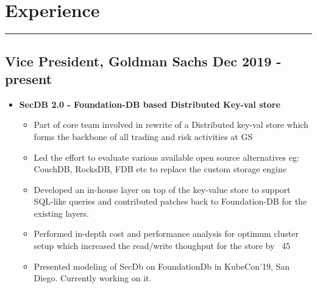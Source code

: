 \section*{Experience}
\hrule
\vspace{0.3cm}
\subsection*{\small {Vice President, Goldman Sachs \hfill Dec 2019 - present}}
\begin{itemize}[label=\textperiodcentered,labelindent=0pt,itemindent=1em,leftmargin=0.3cm,itemsep=0pt]
    \begin{itemize}[label=\textperiodcentered,itemindent=1em,leftmargin=0.3cm,itemsep=0pt]
        \item \textbf{SecDB 2.0 - Foundation-DB based Distributed Key-val store}
            \begin{itemize}
                \item {Part of core team involved in rewrite of a Distributed key-val store which forms the backbone of all trading and risk activities at GS}
                \item {Led the effort to evaluate various available open source alternatives eg: CouchDB, RocksDB, FDB etc to replace the custom storage engine}
                \item Developed an in-house layer on top of the key-value store to support SQL-like queries and contributed patches back to Foundation-DB for the existing layers.
                \item Performed in-depth cost and performance analysis for optimum cluster setup which increased the read/write thoughput for the store by ~45%
                \item Presented modeling of SecDb on FoundationDb in KubeCon'19, San Diego. Currently working on it.  
            \end{itemize}        
\end{itemize}

\end{itemize}
